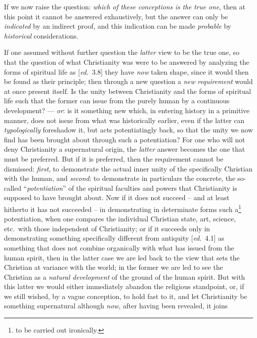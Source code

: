 \documentclass[12pt,a4paper,openany]{book}
\newcommand{\kpage}[1]{\marginnote{\footnotesize\textit{[#1]}}}
\newcommand{\ed}[1]{{\small[\textit{ed.}\ #1]}}
\begin{document}
If we now raise the question: \emph{which of these conceptions is the}
\emph{true one}, then at this point it cannot be answered exhaustively, but
the answer can only be \emph{indicated} by an indirect proof, and this indication
can be made \emph{probable} by \emph{historical} considerations.

If one assumed without further question the \emph{latter} view to be the true one, so
that the question of what Christianity was were to be
answered by analyzing the forms of spiritual life as
\ed{3.8} they have \emph{now} taken shape, since it would then be found as their
principle; then through a new question a \emph{new}
\emph{requirement} would at once present itself. Is the unity between Christianity and the forms of spiritual
life such that the former can issue from the purely human
by a continuous development? --- \emph{or}: is it something new which,
in entering history in a primitive manner, does not issue
from what was historically earlier, even if the latter can \emph{typologically} foreshadow it, but
acts potentiatingly back, so that the unity we now find has been
brought about through such a potentiation? For one who will not
deny Christianity a supernatural origin, the
\emph{latter} answer becomes the one that must be preferred. But if it is preferred, then
the requirement cannot be dismissed: \emph{first}, to demonstrate the actual
inner unity of the specifically Christian with the human, and \emph{second}:
to demonstrate in particulars the concrete, the so-called ``\emph{potentiation}''
of the spiritual faculties and powers that Christianity is supposed to
have brought about. Now if it does not succeed -- and at least hitherto it has not
\kpage{86}succeeded -- in demonstrating in determinate forms such a\footnote[11]{to be carried out ironically.} potentiation,
when one compares the individual Christian state, art, science,
etc.\ with those independent of Christianity; or if it succeeds
only in demonstrating something specifically different from antiquity \ed{4.1} as
something that does not combine organically with what has issued from
the human spirit, then in the latter case we are led back to the
view that sets the Christian at variance with the world; in the former
we are led to see the Christian as a \emph{natural development} of the ground of the human
spirit. But with this latter we would either immediately
abandon the religious standpoint, or, if we still wished, by a
vague conception, to hold fast to it, and let Christianity
be something supernatural although \emph{now}, after having been revealed, it joins
\end{document}
